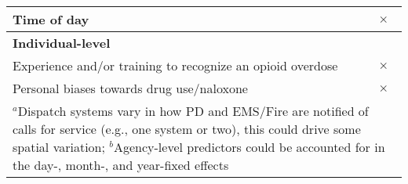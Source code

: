 \begin{table}[htbp]
\begin{adjustbox}{max width=\linewidth}
\begin{tabular}{lc}
            Time of day & \(\times\) \\
            \midrule
            \textbf{Individual-level} & \\
            Experience and/or training to recognize an opioid overdose & \(\times\) \\
            Personal biases towards drug use/naloxone & \(\times\) \\
            \bottomrule
            \multicolumn{2}{p{17cm}}{\footnotesize $^{a}$Dispatch systems vary in how PD and EMS/Fire are notified of calls for service (e.g., one system or two), this could drive some spatial variation; $^{b}$Agency-level predictors could be accounted for in the day-, month-, and year-fixed effects}\\
        \end{tabular} 
    \end{adjustbox}
\end{table}